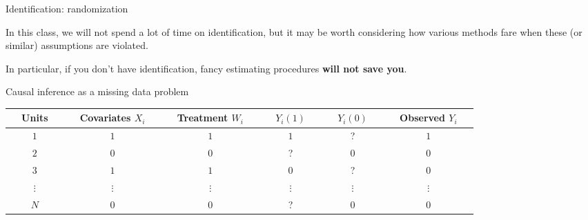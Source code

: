 \documentclass[xcolor={dvipsnames},handout]{beamer}
\begin{document}

\begin{frame}{Identification: randomization}

\begin{wideitemize}
\item In this class, we will not spend a lot of time on identification, but it may be worth considering how various methods fare when these (or similar) assumptions are violated. \pause
\item In particular, if you don't have identification, fancy estimating procedures \textbf{will not save you}. 
\end{wideitemize}

\end{frame}



\begin{frame}{Causal inference as a missing data problem}

\begin{table}[]
\begin{tabular}{cccccc}
\multicolumn{1}{c}{\ \ Units\ \ } &\multicolumn{1}{c}{\ \ Covariates $X_i$\ \ } & \multicolumn{1}{c}{\ \ Treatment $W_i$\ \ } & \multicolumn{1}{c}{\ \ $Y_i(1)$\ \ } & \multicolumn{1}{c}{\ \ $Y_i(0)$\ \ } & \multicolumn{1}{c}{\ \ Observed  $Y_i$\ \ } \\
\hline
$1$       & $1$     &$1$         & $1$      & ?        & $1$            \\
$2$       & $0$     &$0$     & ?        & $0$     & $0$           \\
$3$       & $1$     &$1$     & $0$      & ?        & $0$            \\
$\vdots$  & $\vdots$  & $\vdots$       & $\vdots$ & $\vdots$ & $\vdots$       \\
$N$       & $0$     & $0$         & ?        & $0$      & $0$           
\end{tabular}
\end{table}

\end{frame}
\end{document}
